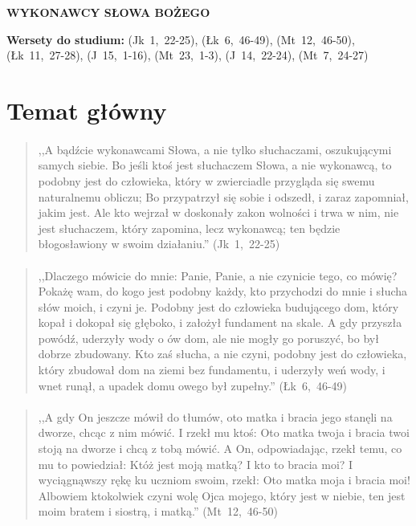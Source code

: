 \documentclass[10pt,a4paper,oneside]{article}
\begin{document}
\centerline{\textbf{\MakeUppercase{Wykonawcy Słowa Bożego}}}
\begin{center}
\textbf{Wersety do studium:} \mbox{(Jk 1, 22-25)}, \mbox{(Łk 6, 46-49)}, \mbox{(Mt 12, 46-50)}, \mbox{(Łk 11, 27-28)}, \mbox{(J 15, 1-16)}, \mbox{(Mt 23, 1-3)}, \mbox{(J 14, 22-24)}, \mbox{(Mt 7, 24-27)}
\end{center}
\section{Temat główny}
\paragraph{}
\begin{quote}
,,A bądźcie wykonawcami Słowa, a nie tylko słuchaczami, oszukującymi samych siebie. Bo jeśli ktoś jest słuchaczem Słowa, a nie wykonawcą, to podobny jest do człowieka, który w zwierciadle przygląda się swemu naturalnemu obliczu; Bo przypatrzył się sobie i odszedł, i zaraz zapomniał, jakim jest. Ale kto wejrzał w doskonały zakon wolności i trwa w nim, nie jest słuchaczem, który zapomina, lecz wykonawcą; ten będzie błogosławiony w swoim działaniu.'' \mbox{(Jk 1, 22-25)}
\end{quote}
\paragraph{}
\begin{quote}
,,Dlaczego mówicie do mnie: Panie, Panie, a nie czynicie tego, co mówię? Pokażę wam, do kogo jest podobny każdy, kto przychodzi do mnie i słucha słów moich, i czyni je. Podobny jest do człowieka budującego dom, który kopał i dokopał się głęboko, i założył fundament na skale. A gdy przyszła powódź, uderzyły wody o ów dom, ale nie mogły go poruszyć, bo był dobrze zbudowany. Kto zaś słucha, a nie czyni, podobny jest do człowieka, który zbudował dom na ziemi bez fundamentu, i uderzyły weń wody, i wnet runął, a upadek domu owego był zupełny.'' \mbox{(Łk 6, 46-49)}
\end{quote}
\paragraph{}
\begin{quote}
,,A gdy On jeszcze mówił do tłumów, oto matka i bracia jego stanęli na dworze, chcąc z nim mówić. I rzekł mu ktoś: Oto matka twoja i bracia twoi stoją na dworze i chcą z tobą mówić. A On, odpowiadając, rzekł temu, co mu to powiedział: Któż jest moją matką? I kto to bracia moi? I wyciągnąwszy rękę ku uczniom swoim, rzekł: Oto matka moja i bracia moi! Albowiem ktokolwiek czyni wolę Ojca mojego, który jest w niebie, ten jest moim bratem i siostrą, i matką.'' \mbox{(Mt 12, 46-50)}
\end{quote}
\end{document}
